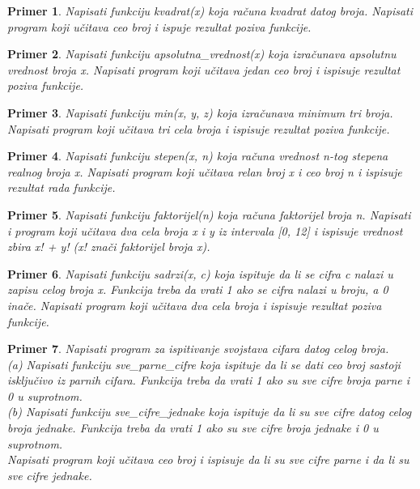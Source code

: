 \documentclass[a4paper]{article}
\newtheorem{primer}{Primer}[section]
\begin{document}
\begin{primer}
Napisati funkciju kvadrat(x) koja računa kvadrat
datog broja. Napisati program koji učitava ceo broj i ispuje rezultat poziva
funkcije.
\end{primer}

\begin{primer}
Napisati funkciju apsolutna\_vrednost(x) koja izračunava apsolutnu vrednost broja x. Napisati program koji učitava jedan ceo broj i ispisuje rezultat poziva funkcije.
\end{primer}

\begin{primer}
Napisati funkciju min(x, y, z) koja izračunava minimum tri broja. Napisati program koji učitava tri cela broja i ispisuje rezultat poziva funkcije.
\end{primer}

\begin{primer}
Napisati funkciju stepen(x, n) koja
računa vrednost n-tog stepena realnog broja x. Napisati program koji učitava
relan broj x i ceo broj n i ispisuje rezultat rada funkcije.
\end{primer}

\begin{primer}
Napisati funkciju faktorijel(n) koja računa
faktorijel broja n. Napisati i program koji učitava dva cela broja x i y iz intervala
[0, 12] i ispisuje vrednost zbira x! + y! (x! znači faktorijel broja x).
\end{primer}

\begin{primer}
Napisati funkciju sadrzi(x, c) koja ispituje
da li se cifra c nalazi u zapisu celog broja x. Funkcija treba da vrati 1 ako se cifra
nalazi u broju, a 0 inače. Napisati program koji učitava dva cela broja i ispisuje
rezultat poziva funkcije.
\end{primer}

\begin{primer}
Napisati program za ispitivanje svojstava cifara datog celog
broja.\\
(a) Napisati funkciju sve\_parne\_cifre koja ispituje da li se dati ceo broj sastoji
isključivo iz parnih cifara. Funkcija treba da vrati 1 ako su sve cifre
broja parne i 0 u suprotnom.\\
(b) Napisati funkciju sve\_cifre\_jednake koja ispituje da li su sve cifre datog
celog broja jednake. Funkcija treba da vrati 1 ako su sve cifre broja jednake
i 0 u suprotnom.\\
Napisati program koji učitava ceo broj i ispisuje da li su sve cifre parne i da li su
sve cifre jednake.
\end{primer}
\end{document}
